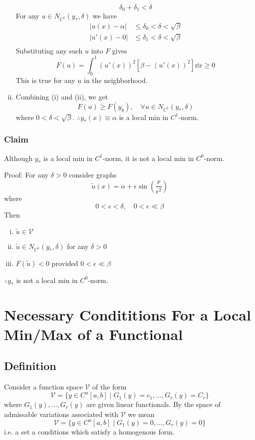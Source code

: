 \documentclass[12pt,twoside]{article}
\begin{document}
\begin{enumerate}[(i)]
  $$\delta_0+\delta_1<\delta$$
  For any $u\in N_{C^1}(y_*,\delta)$ we have
  \begin{align*}
    |u(x)-\alpha| &\le \delta_0 < \delta < \sqrt{\beta} \\
    |u'(x)-0| &\le \delta_1 < \delta < \sqrt{\beta} \\
  \end{align*}
  Substituting any such $u$ into $F$ gives
  \begin{equation*}
    F(u) = \int_0^1{(u'(x))}^2[\beta-{(u'(x))}^2]\dd{x} \ge 0
  \end{equation*}
  This is true for any $u$ in the neighborhood.
\item Combining (i) and (ii), we get
  \begin{equation*}
    F(u) \ge F(y_8),\quad \forall u\in N_{C^1}(y_*,\delta)
  \end{equation*}
  where $0<\delta<\sqrt{\beta}$. $\therefore y_*(x)\equiv\alpha$ is a local min
  in $C^1$-norm.
\end{enumerate}

\subsubsection*{Claim}
Although $y_*$ is a local min in $C^1$-norm, it is not a local min in
$C^0$-norm.

Proof: For any $\delta>0$ consider graphs
$$\tilde{u}(x)=\alpha+\epsilon\sin\left( \frac{x}{\epsilon^2} \right)$$
where
$$0<\epsilon<\delta,\quad 0<\epsilon\ll \beta$$
Then
\begin{enumerate}[(i)]
\item $\tilde{u}\in\mathcal{V}$
\item $\tilde{u}\in N_{C^1}(y_*,\delta)$ for any $\delta>0$
\item $F(\tilde{u})<0$ provided $0<\epsilon\ll\beta$
\end{enumerate}
$\therefore y_*$  is not a local min in $C^0$-norm.

\section{Necessary Condititions For a Local Min/Max of a Functional}
\subsection{Definition}
Consider a function space $\mathcal{V}$ of the form
\begin{equation*}
  \mathcal{V} = \{y\in C^n[a,b]\;|\;G_1(y)=c_1,\ldots,G_r(y)=C_r\}
\end{equation*}
where $G_1(y),\ldots,G_r(y)$ are given linear functionals. By the space of
admissable variations associated with $\mathcal{V}$ we mean
\begin{equation*}
  \mathcal{V} = \{y\in C^n[a,b]\;|\;G_1(y)=0,\ldots,G_r(y)=0\}
\end{equation*}
i.e. a set a conditions which satisfy a homogenous form.
\end{document}
